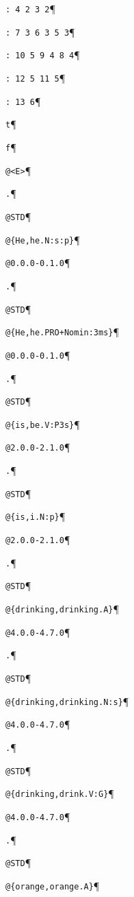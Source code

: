 \noindent\verb$: 4 2 3 2$\P

\noindent\verb$: 7 3 6 3 5 3$\P

\noindent\verb$: 10 5 9 4 8 4$\P

\noindent\verb$: 12 5 11 5$\P

\noindent\verb$: 13 6$\P

\noindent\verb$t$\P

\noindent\verb$f$\P

\noindent\verb$@<E>$\P

\noindent\verb$.$\P

\noindent\verb$@STD$\P

\noindent\verb$@{He,he.N:s:p}$\P

\noindent\verb$@0.0.0-0.1.0$\P

\noindent\verb$.$\P

\noindent\verb$@STD$\P

\noindent\verb$@{He,he.PRO+Nomin:3ms}$\P

\noindent\verb$@0.0.0-0.1.0$\P

\noindent\verb$.$\P

\noindent\verb$@STD$\P

\noindent\verb$@{is,be.V:P3s}$\P

\noindent\verb$@2.0.0-2.1.0$\P

\noindent\verb$.$\P

\noindent\verb$@STD$\P

\noindent\verb$@{is,i.N:p}$\P

\noindent\verb$@2.0.0-2.1.0$\P

\noindent\verb$.$\P

\noindent\verb$@STD$\P

\noindent\verb$@{drinking,drinking.A}$\P

\noindent\verb$@4.0.0-4.7.0$\P

\noindent\verb$.$\P

\noindent\verb$@STD$\P

\noindent\verb$@{drinking,drinking.N:s}$\P

\noindent\verb$@4.0.0-4.7.0$\P

\noindent\verb$.$\P

\noindent\verb$@STD$\P

\noindent\verb$@{drinking,drink.V:G}$\P

\noindent\verb$@4.0.0-4.7.0$\P

\noindent\verb$.$\P

\noindent\verb$@STD$\P

\noindent\verb$@{orange,orange.A}$\P


